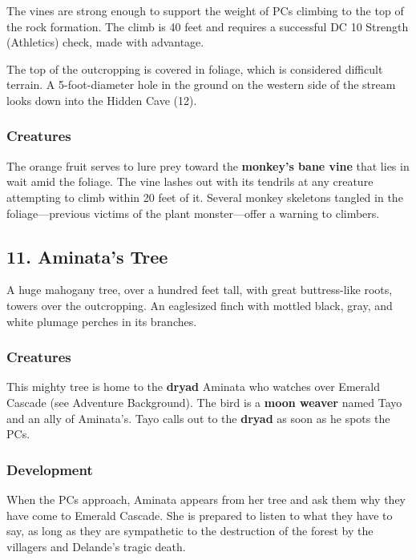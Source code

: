 \documentclass[10pt,a4paper,twoside,bg=print,twocolumn,openany,nodeprecatedcode]{dndbook}
\begin{document}
The vines are strong enough to support the weight of PCs climbing to the top of the rock formation. The climb is 40 feet and requires a successful DC 10 Strength (Athletics) check, made with advantage.

The top of the outcropping is covered in foliage, which is considered difficult terrain. A 5-foot-diameter hole in the ground on the western side of the stream looks down into the Hidden Cave (12).

\subsubsection{Creatures}
The orange fruit serves to lure prey toward the \textbf{monkey's bane vine} that lies in wait amid the foliage. The vine lashes out with its tendrils at any creature attempting to climb within 20 feet of it. Several monkey skeletons tangled in the foliage—previous victims of the plant monster—offer a warning to climbers.

\subsection{11. Aminata's Tree}
\begin{DndReadAloud}{}
A huge mahogany tree, over a hundred feet tall, with great buttress-like roots, towers over the outcropping. An eaglesized finch with mottled black, gray, and white plumage perches in its branches.

\end{DndReadAloud}

\subsubsection{Creatures}
This mighty tree is home to the \textbf{dryad} Aminata who watches over Emerald Cascade (see Adventure Background). The bird is a \textbf{moon weaver} named Tayo and an ally of Aminata's. Tayo calls out to the \textbf{dryad} as soon as he spots the PCs.

\subsubsection{Development}
When the PCs approach, Aminata appears from her tree and ask them why they have come to Emerald Cascade. She is prepared to listen to what they have to say, as long as they are sympathetic to the destruction of the forest by the villagers and Delande's tragic death.
\end{document}

